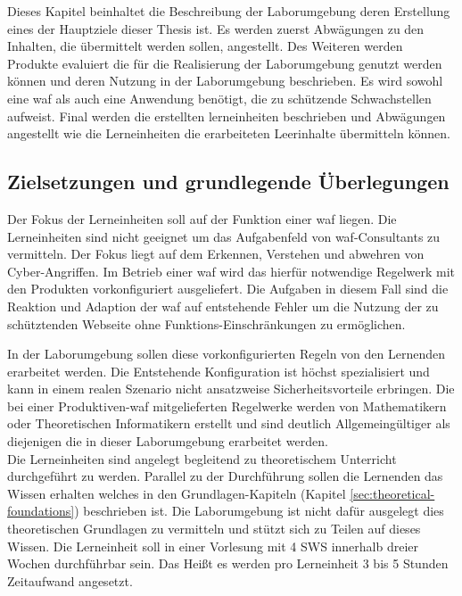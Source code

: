 Dieses Kapitel beinhaltet die Beschreibung der Laborumgebung deren Erstellung eines der Hauptziele dieser Thesis ist.
Es werden zuerst Abwägungen zu den Inhalten, die übermittelt werden sollen, angestellt.
Des Weiteren werden Produkte evaluiert die für die Realisierung der Laborumgebung genutzt werden können und deren Nutzung in der Laborumgebung beschrieben.
Es wird sowohl eine \ac{waf} als auch eine Anwendung benötigt, die zu schützende Schwachstellen aufweist.
Final werden die erstellten lerneinheiten beschrieben und Abwägungen angestellt wie die Lerneinheiten die erarbeiteten Leerinhalte übermitteln können.

\subsection{Zielsetzungen und grundlegende Überlegungen}
\label{sec:learnings-metha}

Der Fokus der Lerneinheiten soll auf der Funktion einer \ac{waf} liegen.
Die Lerneinheiten sind nicht geeignet um das Aufgabenfeld von \ac{waf}-Consultants zu vermitteln.
Der Fokus liegt auf dem Erkennen, Verstehen und abwehren von Cyber-Angriffen.
Im Betrieb einer \ac{waf} wird das hierfür notwendige Regelwerk mit den Produkten vorkonfiguriert ausgeliefert.
Die Aufgaben in diesem Fall sind die Reaktion und Adaption der \ac{waf} auf entstehende Fehler um die Nutzung der zu schütztenden Webseite ohne Funktions-Einschränkungen zu ermöglichen.

In der Laborumgebung sollen diese vorkonfigurierten Regeln von den Lernenden erarbeitet werden.
Die Entstehende Konfiguration ist höchst spezialisiert und kann in einem realen Szenario nicht ansatzweise Sicherheitsvorteile erbringen.
Die bei einer Produktiven-\ac{waf} mitgelieferten Regelwerke werden von Mathematikern oder Theoretischen Informatikern erstellt und sind deutlich Allgemeingültiger als diejenigen die in dieser Laborumgebung erarbeitet werden.\\

Die Lerneinheiten sind angelegt begleitend zu theoretischem Unterricht durchgeführt zu werden.
Parallel zu der Durchführung sollen die Lernenden das Wissen erhalten welches in den Grundlagen-Kapiteln (Kapitel \ref{sec:theoretical-foundations}) beschrieben ist.
Die Laborumgebung ist nicht dafür ausgelegt dies theoretischen Grundlagen zu vermitteln und stützt sich zu Teilen auf dieses Wissen.
Die Lerneinheit soll in einer Vorlesung mit 4 SWS innerhalb dreier Wochen durchführbar sein.
Das Heißt es werden pro Lerneinheit 3 bis 5 Stunden Zeitaufwand angesetzt.

